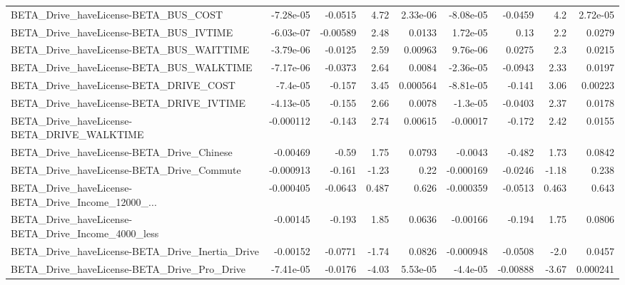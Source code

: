 \begin{tabular}{lrrrrrrrr}
BETA\_Drive\_haveLicense-BETA\_BUS\_COST               &   -7.28e-05 &      -0.0515 &     4.72 & 2.33e-06 &  -8.08e-05 &     -0.0459 &          4.2 &      2.72e-05 \\
BETA\_Drive\_haveLicense-BETA\_BUS\_IVTIME             &   -6.03e-07 &     -0.00589 &     2.48 &   0.0133 &   1.72e-05 &        0.13 &          2.2 &        0.0279 \\
BETA\_Drive\_haveLicense-BETA\_BUS\_WAITTIME           &   -3.79e-06 &      -0.0125 &     2.59 &  0.00963 &   9.76e-06 &      0.0275 &          2.3 &        0.0215 \\
BETA\_Drive\_haveLicense-BETA\_BUS\_WALKTIME           &   -7.17e-06 &      -0.0373 &     2.64 &   0.0084 &  -2.36e-05 &     -0.0943 &         2.33 &        0.0197 \\
BETA\_Drive\_haveLicense-BETA\_DRIVE\_COST             &    -7.4e-05 &       -0.157 &     3.45 & 0.000564 &  -8.81e-05 &      -0.141 &         3.06 &       0.00223 \\
BETA\_Drive\_haveLicense-BETA\_DRIVE\_IVTIME           &   -4.13e-05 &       -0.155 &     2.66 &   0.0078 &   -1.3e-05 &     -0.0403 &         2.37 &        0.0178 \\
BETA\_Drive\_haveLicense-BETA\_DRIVE\_WALKTIME         &   -0.000112 &       -0.143 &     2.74 &  0.00615 &   -0.00017 &      -0.172 &         2.42 &        0.0155 \\
BETA\_Drive\_haveLicense-BETA\_Drive\_Chinese          &    -0.00469 &        -0.59 &     1.75 &   0.0793 &    -0.0043 &      -0.482 &         1.73 &        0.0842 \\
BETA\_Drive\_haveLicense-BETA\_Drive\_Commute          &   -0.000913 &       -0.161 &    -1.23 &     0.22 &  -0.000169 &     -0.0246 &        -1.18 &         0.238 \\
BETA\_Drive\_haveLicense-BETA\_Drive\_Income\_12000\_... &   -0.000405 &      -0.0643 &    0.487 &    0.626 &  -0.000359 &     -0.0513 &        0.463 &         0.643 \\
BETA\_Drive\_haveLicense-BETA\_Drive\_Income\_4000\_less &    -0.00145 &       -0.193 &     1.85 &   0.0636 &   -0.00166 &      -0.194 &         1.75 &        0.0806 \\
BETA\_Drive\_haveLicense-BETA\_Drive\_Inertia\_Drive    &    -0.00152 &      -0.0771 &    -1.74 &   0.0826 &  -0.000948 &     -0.0508 &         -2.0 &        0.0457 \\
BETA\_Drive\_haveLicense-BETA\_Drive\_Pro\_Drive        &   -7.41e-05 &      -0.0176 &    -4.03 & 5.53e-05 &   -4.4e-05 &    -0.00888 &        -3.67 &      0.000241 \\

\end{tabular}
